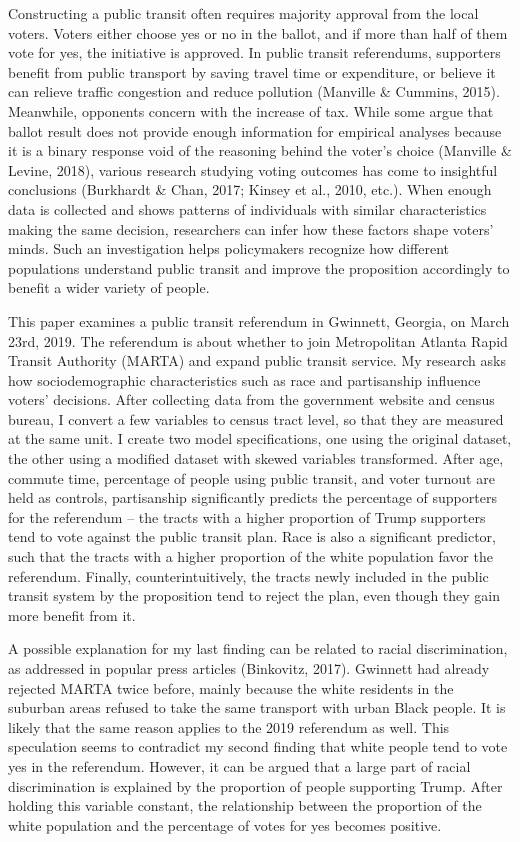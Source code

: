 \documentclass[
]{article}
\begin{document}
Constructing a public transit often requires majority approval from the
local voters. Voters either choose yes or no in the ballot, and if more
than half of them vote for yes, the initiative is approved. In public
transit referendums, supporters benefit from public transport by saving
travel time or expenditure, or believe it can relieve traffic congestion
and reduce pollution (Manville \& Cummins, 2015). Meanwhile, opponents
concern with the increase of tax. While some argue that ballot result
does not provide enough information for empirical analyses because it is
a binary response void of the reasoning behind the voter's choice
(Manville \& Levine, 2018), various research studying voting outcomes
has come to insightful conclusions (Burkhardt \& Chan, 2017; Kinsey et
al., 2010, etc.). When enough data is collected and shows patterns of
individuals with similar characteristics making the same decision,
researchers can infer how these factors shape voters' minds. Such an
investigation helps policymakers recognize how different populations
understand public transit and improve the proposition accordingly to
benefit a wider variety of people.

This paper examines a public transit referendum in Gwinnett, Georgia, on
March 23rd, 2019. The referendum is about whether to join Metropolitan
Atlanta Rapid Transit Authority (MARTA) and expand public transit
service. My research asks how sociodemographic characteristics such as
race and partisanship influence voters' decisions. After collecting data
from the government website and census bureau, I convert a few variables
to census tract level, so that they are measured at the same unit. I
create two model specifications, one using the original dataset, the
other using a modified dataset with skewed variables transformed. After
age, commute time, percentage of people using public transit, and voter
turnout are held as controls, partisanship significantly predicts the
percentage of supporters for the referendum -- the tracts with a higher
proportion of Trump supporters tend to vote against the public transit
plan. Race is also a significant predictor, such that the tracts with a
higher proportion of the white population favor the referendum. Finally,
counterintuitively, the tracts newly included in the public transit
system by the proposition tend to reject the plan, even though they gain
more benefit from it.

A possible explanation for my last finding can be related to racial
discrimination, as addressed in popular press articles (Binkovitz,
2017). Gwinnett had already rejected MARTA twice before, mainly because
the white residents in the suburban areas refused to take the same
transport with urban Black people. It is likely that the same reason
applies to the 2019 referendum as well. This speculation seems to
contradict my second finding that white people tend to vote yes in the
referendum. However, it can be argued that a large part of racial
discrimination is explained by the proportion of people supporting
Trump. After holding this variable constant, the relationship between
the proportion of the white population and the percentage of votes for
yes becomes positive.
\end{document}
